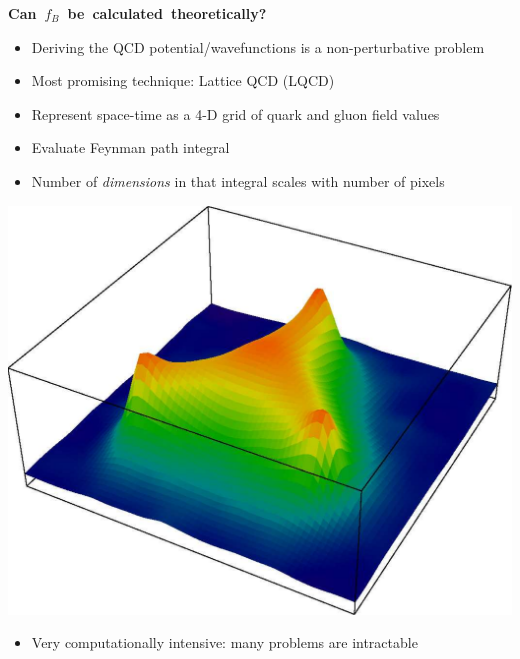 \documentclass[landscape]{article}
\newenvironment{slide}[1][ ]{\mbox{\bf \boldmath #1 } \vfill}{\vfill \vspace{-1.5 cm} \mbox{ } \pagebreak}
\newenvironment{itemizer}[1]{\begin{itemize}\setlength{\itemsep}{#1}}{\end{itemize}}
\begin{document}
\begin{slide}[Can $f_B$ be calculated theoretically?]

\begin{itemizer}{1 cm}

  \item Deriving the QCD potential/wavefunctions is a non-perturbative problem

  \item Most promising technique: Lattice QCD (LQCD)

\end{itemizer}

\vspace{1 cm}
\begin{minipage}{0.5\linewidth}
  \begin{itemizer}{1 cm}
    \item Represent space-time as a 4-D grid of quark and gluon field values

    \item Evaluate Feynman path integral

    \item Number of {\it dimensions} in that \mbox{integral} scales
    with number of \mbox{pixels}

  \end{itemizer}
\end{minipage} \hfill \begin{minipage}{0.45\linewidth}
  \includegraphics[width=\linewidth]{../qcd_proton}
\end{minipage}

\vspace{1 cm}
\begin{itemizer}{1 cm}

  \item Very computationally intensive: many problems are intractable

\end{itemizer}

\end{slide}
\end{document}
